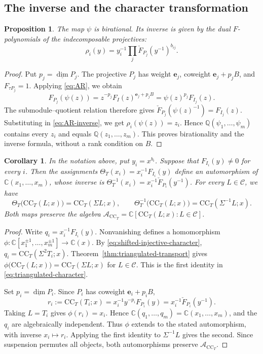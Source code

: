 \documentclass[11pt]{amsart}
\numberwithin{equation}{section}
\newtheorem{proposition}[theorem]{Proposition}
\newtheorem{corollary}[theorem]{Corollary}
\theoremstyle{definition}
\theoremstyle{remark}
\newcommand{\C}{\mathcal C}
\newcommand{\CC}{\mathrm{CC}}
\newcommand{\QQ}{\mathbb Q}
\newcommand{\dv}{\underline{\dim}}
\begin{document}
\subsection{The inverse and the character transformation}
\begin{proposition}\label{prop:AR-inverse}
The map $\psi$ is birational. Its inverse is given by the dual
$F$-polynomials of the indecomposable projectives:
\begin{equation}\label{eq:AR-inverse} \rho_i(y)=y_i^{-1}\prod_j\check F_{P_j}(y^{-1})^{b_{ij}}.\end{equation}
\end{proposition}

\begin{proof}
Put $p_j=\dv P_j$. The projective $P_j$ has weight $\mathbf e_j$,
coweight $\mathbf e_j+p_jB$, and $F_{\tau P_j}=1$. Applying
\eqref{eq:AR}, we obtain
\[ F_{P_j}(\psi(z))=z^{-p_j}F_I(z)^{\mathbf e_j+p_jB}=\psi(z)^{p_j}F_{I_j}(z). \]
The submodule--quotient relation therefore gives
$\check F_{P_j}(\psi(z)^{-1})=F_{I_j}(z)$. 
Substituting in \eqref{eq:AR-inverse}, we get
$\rho_i(\psi(z))=z_i$. Hence $\QQ(\psi_1,\ldots,\psi_m)$
contains every $z_i$ and equals $\QQ(z_1,\ldots,z_m)$. This proves
birationality and the inverse formula, without a rank condition on $B$.
\end{proof}

\begin{corollary}\label{cor:triangulated-character}
In the notation above, put $y_i=x^{b_i}$. Suppose that
$F_{I_i}(y)\ne0$ for every $i$. Then the assignments
$\Theta_T(x_i)=x_i^{-1}F_{I_i}(y)$
define an automorphism of $\mathbb C(x_1,\ldots,x_m)$, whose inverse is
$\Theta_T^{-1}(x_i)=x_i^{-1}\check F_{P_i}(y^{-1})$.
For every $L\in\C$, we have
\begin{equation}\label{eq:triangulated-character} \Theta_T\bigl(\CC_T(L;x)\bigr)=\CC_T(\Sigma L;x),\qquad \Theta_T^{-1}\bigl(\CC_T(L;x)\bigr)=\CC_T(\Sigma^{-1}L;x).\end{equation}
Both maps preserve the algebra
$\mathscr A_{\CC_T}=\mathbb C[\CC_T(L;x):L\in\C]$.
\end{corollary}

\begin{proof}
Write $q_i=x_i^{-1}F_{I_i}(y)$. Nonvanishing defines a homomorphism
$\phi:\mathbb C[x_1^{\pm1},\ldots,x_m^{\pm1}]\to\mathbb C(x)$.
By \eqref{eq:shifted-injective-character},
$q_i=\CC_T(\Sigma^2T_i;x)$. Theorem~\ref{thm:triangulated-transport} gives
$\phi\bigl(\CC_T(L;x)\bigr)=\CC_T(\Sigma L;x)$ for $L\in\C$.
This is the first identity in \eqref{eq:triangulated-character}.

Set $p_i=\dv P_i$. Since $P_i$ has coweight $\mathbf e_i+p_iB$,
\[ r_i:=\CC_T(T_i;x)=x_i^{-1}y^{-p_i}F_{P_i}(y)=x_i^{-1}\check F_{P_i}(y^{-1}). \]
Taking $L=T_i$ gives $\phi(r_i)=x_i$. Hence
$\mathbb C(q_1,\ldots,q_m)=\mathbb C(x_1,\ldots,x_m)$, and the
$q_i$ are algebraically independent. Thus $\phi$ extends to the
stated automorphism, with inverse $x_i\mapsto r_i$. Applying the first
identity to $\Sigma^{-1}L$ gives the second. Since suspension permutes
all objects, both automorphisms preserve $\mathscr A_{\CC_T}$.
\end{proof}
\end{document}
